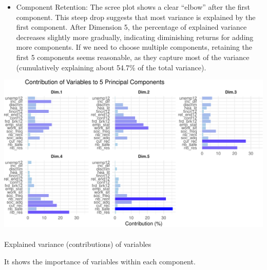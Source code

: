 \documentclass[
]{article}
\makeatletter
\let\oldparagraph\paragraph
\renewcommand{\paragraph}{
    \@ifstar
      \xxxParagraphStar
      \xxxParagraphNoStar
  }
\newcommand{\xxxParagraphStar}[1]{\oldparagraph*{#1}\mbox{}}
\newcommand{\xxxParagraphNoStar}[1]{\oldparagraph{#1}\mbox{}}
\providecommand{\tightlist}{%
  \setlength{\itemsep}{0pt}\setlength{\parskip}{0pt}}\usepackage{longtable,booktabs,array}
\makeatother
\begin{document}
\begin{itemize}
\tightlist
\item
  Component Retention: The scree plot shows a clear ``elbow'' after the
  first component. This steep drop suggests that most variance is
  explained by the first component. After Dimension 5, the percentage of
  explained variance decreases slightly more gradually, indicating
  diminishing returns for adding more components. If we need to choose
  multiple components, retaining the first 5 components seems
  reasonable, as they capture most of the variance (cumulatively
  explaining about 54.7\% of the total variance).
\end{itemize}

\begin{center}
\includegraphics{draft_v2_files/figure-pdf/unnamed-chunk-16-1.pdf}
\end{center}

\paragraph{Explained variance (contributions) of
variables}\label{explained-variance-contributions-of-variables}

It shows the importance of variables within each component.
\end{document}
